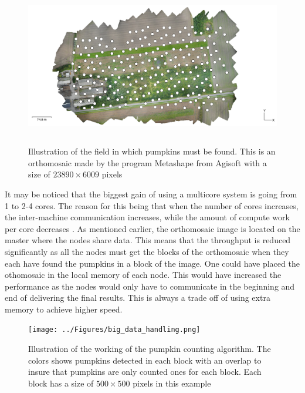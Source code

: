\documentclass[../Head/Report.tex]{subfiles}
\begin{document}
\begin{figure}[H]
	\centering
	\captionsetup{justification=centering}
	\includegraphics[height=7cm]{../Figures/orthomosaic.png}
    \caption{Illustration of the field in which pumpkins must be found. This is an orthomosaic made by the program Metashape from Agisoft with a size of $23890 \times 6009$ pixels}
    \label{fig:orthomosaic}
\end{figure}

It may be noticed that the biggest gain of using a multicore system is going from 1 to 2-4 cores. The reason for this being that when the number of cores increases, the inter-machine communication increases, while the amount of compute work per core decreases \cite{multicore_system}. As mentioned earlier, the orthomosaic image is located on the master where the nodes share data. This means that the throughput is reduced significantly as all the nodes must get the blocks of the orthomosaic when they each have found the pumpkins in a block of the image. One could have placed the othomosaic in the local memory of each node. This would have increased the performance as the nodes would only have to communicate in the beginning and end of delivering the final results. This is always a trade off of using extra memory to achieve higher speed.          

\begin{figure}[H]
	\centering
	\captionsetup{justification=centering}
	\texttt{[image: ../Figures/big\_data\_handling.png]}
    \caption{Illustration of the working of the pumpkin counting algorithm. The colors shows pumpkins detected in each block with an overlap to insure that pumpkins are only counted ones for each block. Each block has a size of $500 \times 500$ pixels in this example}
    \label{fig:pumkins_color}
\end{figure}
\end{document}
